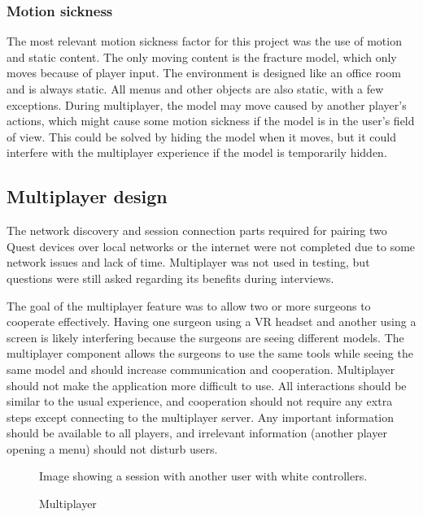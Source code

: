 \documentclass[a4paper]{report}
\begin{document}
\subsubsection{Motion sickness}
The most relevant motion sickness factor for this project was the use of motion and static content. The only moving content is the fracture model, which only moves because of player input. The environment is designed like an office room and is always static. All menus and other objects are also static, with a few exceptions.
During multiplayer, the model may move caused by another player's actions, which might cause some motion sickness if the model is in the user's field of view. This could be solved by hiding the model when it moves, but it could interfere with the multiplayer experience if the model is temporarily hidden.

\subsection{Multiplayer design}
The network discovery and session connection parts required for pairing two Quest devices over local networks or the internet were not completed due to some network issues and lack of time. Multiplayer was not used in testing, but questions were still asked regarding its benefits during interviews.

The goal of the multiplayer feature was to allow two or more surgeons to cooperate effectively. Having one surgeon using a VR headset and another using a screen is likely interfering because the surgeons are seeing different models. The multiplayer component allows the surgeons to use the same tools while seeing the same model and should increase communication and cooperation.
Multiplayer should not make the application more difficult to use. All interactions should be similar to the usual experience, and cooperation should not require any extra steps except connecting to the multiplayer server. Any important information should be available to all players, and irrelevant information (another player opening a menu) should not disturb users.

\begin{figure}[h!]
    \centering
	\hfill
	\caption{Multiplayer}\label{multiplayer}
  \small
  Image showing a session with another user with white controllers.
\end{figure}
\end{document}
